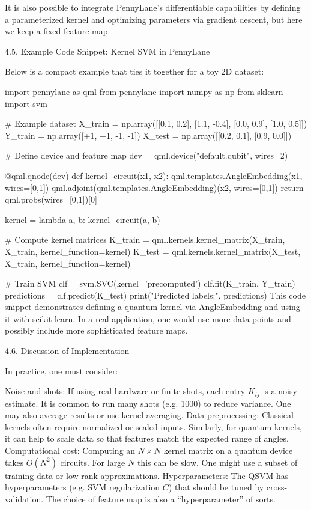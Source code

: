 It is also possible to integrate PennyLane’s differentiable capabilities by defining a parameterized kernel and optimizing parameters via gradient descent, but here we keep a fixed feature map.





4.5. Example Code Snippet: Kernel SVM in PennyLane





Below is a compact example that ties it together for a toy 2D dataset:

import pennylane as qml
from pennylane import numpy as np
from sklearn import svm

# Example dataset
X_train = np.array([[0.1, 0.2], [1.1, -0.4], [0.0, 0.9], [1.0, 0.5]])
Y_train = np.array([+1, +1, -1, -1])
X_test = np.array([[0.2, 0.1], [0.9, 0.0]])

# Define device and feature map
dev = qml.device("default.qubit", wires=2)

@qml.qnode(dev)
def kernel_circuit(x1, x2):
    qml.templates.AngleEmbedding(x1, wires=[0,1])
    qml.adjoint(qml.templates.AngleEmbedding)(x2, wires=[0,1])
    return qml.probs(wires=[0,1])[0]

kernel = lambda a, b: kernel_circuit(a, b)

# Compute kernel matrices
K_train = qml.kernels.kernel_matrix(X_train, X_train, kernel_function=kernel)
K_test = qml.kernels.kernel_matrix(X_test, X_train, kernel_function=kernel)

# Train SVM
clf = svm.SVC(kernel='precomputed')
clf.fit(K_train, Y_train)
predictions = clf.predict(K_test)
print("Predicted labels:", predictions)
This code snippet demonstrates defining a quantum kernel via AngleEmbedding and using it with scikit-learn.  In a real application, one would use more data points and possibly include more sophisticated feature maps.





4.6. Discussion of Implementation





In practice, one must consider:



Noise and shots: If using real hardware or finite shots, each entry $K_{ij}$ is a noisy estimate.  It is common to run many shots (e.g. 1000) to reduce variance.  One may also average results or use kernel averaging.
Data preprocessing: Classical kernels often require normalized or scaled inputs.  Similarly, for quantum kernels, it can help to scale data so that features match the expected range of angles.
Computational cost: Computing an $N\times N$ kernel matrix on a quantum device takes $O(N^2)$ circuits.  For large $N$ this can be slow.  One might use a subset of training data or low-rank approximations.
Hyperparameters: The QSVM has hyperparameters (e.g. SVM regularization $C$) that should be tuned by cross-validation.  The choice of feature map is also a “hyperparameter” of sorts.




